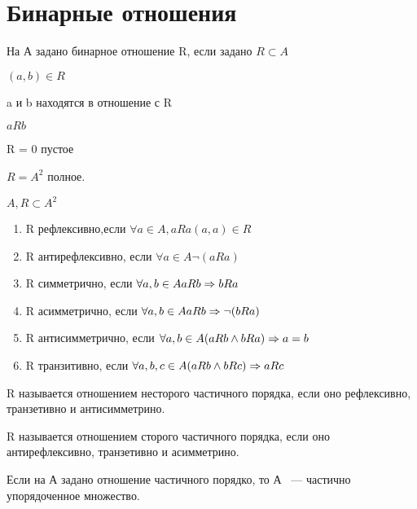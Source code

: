 ﻿\section{Бинарные отношения}
\begin{Def}
На А задано бинарное отношение R, если задано $R \subset A$

$(a, b) \in R$

a и b находятся в отношение с R

$a R b$

R = 0 пустое

$R = A^2$ полное. 
\end{Def}

\begin{Def}
$A, R \subset A^2$
\begin{enumerate}
\item R рефлексивно,если $\forall a \in A, aRa (a, a)\in R$
\item R антирефлексивно, если $\forall a \in A \neg (aRa)$
\item R симметрично, если $\forall a, b \in A aRb \Rightarrow bRa$
\item R асимметрично, если $\forall a, b \in A aRb \Rightarrow \neg(bRa)$
\item R антисимметрично, если $\forall a, b \in A (aRb \wedge bRa) \Rightarrow a = b$
\item R транзитивно, если  $\forall a, b, c \in A (aRb \wedge bRc) \Rightarrow aRc$
\end{enumerate}
\end{Def}

\begin{Def}
R называется отношением несторого частичного порядка, если оно рефлексивно, транзетивно и антисимметрино. 
\end{Def}
\begin{Def}
R называется отношением сторого частичного порядка, если оно антирефлексивно, транзетивно и асимметрино. 
\end{Def}

Если на А задано отношение частичного порядко, то А ~--- частично упорядоченное множество.